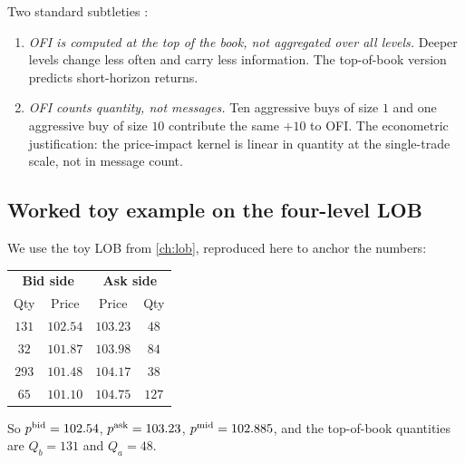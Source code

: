 Two standard subtleties \citeBouchaud{}:
\begin{enumerate}
  \item \emph{OFI is computed at the top of the book, not
  aggregated over all levels.} Deeper levels change less often
  and carry less information. The top-of-book version predicts
  short-horizon returns.
  \item \emph{OFI counts quantity, not messages.} Ten aggressive
  buys of size $1$ and one aggressive buy of size $10$ contribute
  the same $+10$ to OFI. The econometric justification: the
  price-impact kernel is linear in quantity at the single-trade
  scale, not in message count.
\end{enumerate}

\subsection{Worked toy example on the four-level LOB}
\label{sec:ofi_toy}

We use the toy LOB from \cref{ch:lob}, reproduced here to anchor
the numbers:
\begin{center}
\begin{tabular}{cc|cc}
\toprule
\multicolumn{2}{c|}{\textbf{Bid side}} & \multicolumn{2}{c}{\textbf{Ask side}} \\
Qty & Price & Price & Qty \\
\midrule
$131$ & $102.54$ & $103.23$ & $48$ \\
$32$  & $101.87$ & $103.98$ & $84$ \\
$293$ & $101.48$ & $104.17$ & $38$ \\
$65$  & $101.10$ & $104.75$ & $127$ \\
\bottomrule
\end{tabular}
\end{center}
So $p^{\mathrm{bid}} = 102.54$, $p^{\mathrm{ask}} = 103.23$, $p^{\mathrm{mid}} = 102.885$, and the
top-of-book quantities are $Q_b = 131$ and $Q_a = 48$.

